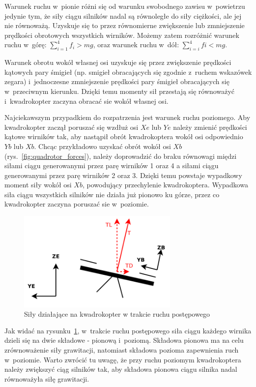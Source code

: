 \documentclass[11pt, twoside]{Thesis} %
\begin{document}
Warunek ruchu w~pionie różni się od warunku swobodnego zawisu w~powietrzu jedynie tym, że siły ciągu silników nadal są równoległe do siły ciężkości, ale jej nie równoważą. Uzyskuje się to przez równomierne zwiększenie lub zmniejszenie prędkości obrotowych wszystkich wirników. Możemy zatem rozróżnić warunek ruchu w~górę: $\sum_{i=1}^{4} f_i > mg$, oraz warunek ruchu w~dół: $\sum_{i=i}^{4} fi < mg$.

Warunek obrotu wokół własnej osi uzyskuje się przez zwiększenie prędkości kątowych pary śmigieł (np. smigieł obracających się zgodnie z~ruchem wskazówek zegara) i~jednoczesne zmniejszenie prędkości pary śmigieł obracających się w~przeciwnym kierunku. Dzięki temu momenty sił przestają się równoważyć i~kwadrokopter zaczyna obracać sie wokół własnej osi.

Najciekawszym przypadkiem do rozpatrzenia jest warunek ruchu poziomego. Aby kwadrokopter zaczął poruszać się wzdłuż osi $Xe$ lub $Ye$ należy zmienić prędkości kątowe wirników tak, aby nastąpił obrót kwadrokoptera wokół osi odpowiednio $Yb$ lub $Xb$. Chcąc przykładowo uzyskać obrót wokół osi $Xb$ (rys.~\ref{fig:quadrotor_forces}), należy doprowadzić do braku równowagi międzi siłami ciągu generowanymi przez parę wirników 1 oraz 4 a siłami ciągu generowanymi przez parę wirników 2 oraz 3. Dzięki temu powstaje wypadkowy moment siły wokół osi $Xb$, powodujący przechylenie kwadrokoptera. Wypadkowa siła ciągu wszystkich silników nie działa już pionowo ku górze, przez co kwadrokopter zaczyna poruszać sie w~poziomie. 

\begin{figure}[H]
	\centering
	\includegraphics[width=0.7\textwidth]{Pictures/quadrotor_drag_force.png}
	\caption[Dynamika ruchu postępowego]{Siły działające na kwadrokopter w trakcie ruchu postępowego}
	\label{fig:quadrotor_drag_force.png}
\end{figure}


Jak widać na rysunku~\ref{fig:quadrotor_drag_force.png}, w~trakcie ruchu postępowego siła ciągu każdego wirnika dzieli się na dwie składowe - pionową i~poziomą. Składowa pionowa ma na celu zrównoważenie siły grawitacji, natomiast składowa pozioma zapewnienia ruch w~poziomie. Warto zwrócić tu uwagę, że przy ruchu poziomym kwadrokoptera należy zwiększyć ciąg silników tak, aby składowa pionowa ciągu silnika nadal równoważyła siłę grawitacji.
\end{document}
